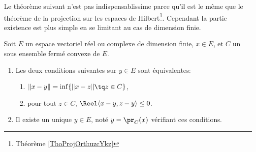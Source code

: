 Le théorème suivant n'est pas indispensablissime parce qu'il est le même que le théorème de la projection sur les espaces de Hilbert\footnote{Théorème \ref{ThoProjOrthuzcYkz}}. Cependant la partie existence est plus simple en se limitant au cas de dimension finie.
\begin{theorem}  \label{ThoWKwosrH}
    Soit \( E\) un espace vectoriel réel ou complexe de dimension finie, \( x\in E\), et \( C\) un sous ensemble fermé convexe de \(E\).
    \begin{enumerate}
        \item
            Les deux conditions suivantes sur \( y\in E\) sont équivalentes:
    \begin{enumerate}
        \item   \label{zzETsfYCSItemi}
            \( \| x-y \|=\inf\{ \| x-z \|\tq z\in C \}\),
        \item\label{zzETsfYCSItemii}
            pour tout \( z\in C\), \( \Reel\langle x-y, z-y\rangle \leq 0\).
    \end{enumerate}
\item
    Il existe un unique \( y\in E\), noté \( y=\pr_C(x)\) vérifiant ces conditions.
    \end{enumerate}
\end{theorem}

